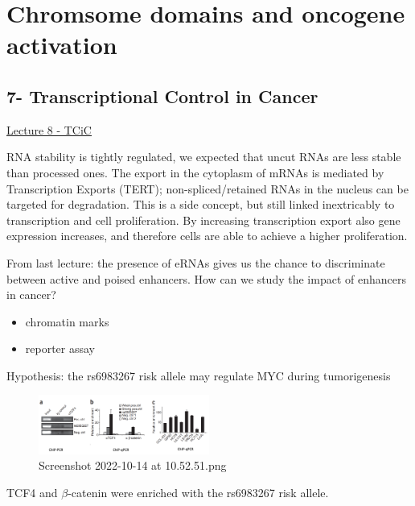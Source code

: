 \graphicspath{{chapters/_resources/}}

\chapter{Chromsome domains and oncogene activation}



\hypertarget{transcriptional-control-in-cancer}{%
\section{7- Transcriptional Control in Cancer}\label{transcriptional-control-in-cancer}}

\href{:/debeaed24e9c444e88c9a5ad1e251391}{Lecture 8 - TCiC}

RNA stability is tightly regulated, we expected that uncut RNAs are less stable than processed ones. The export in the cytoplasm of mRNAs is mediated by Transcription Exports (TERT); non-spliced/retained RNAs in the nucleus can be targeted for degradation. This is a side concept, but still linked inextricably to transcription and cell proliferation. By increasing transcription export also gene expression increases, and therefore cells are able to achieve a higher proliferation.

From last lecture: the presence of eRNAs gives us the chance to discriminate between active and poised enhancers. How can we study the impact of enhancers in cancer?

\begin{itemize}
\tightlist
\item
  chromatin marks
\item
  reporter assay
\end{itemize}

Hypothesis: the rs6983267 risk allele may regulate MYC during tumorigenesis

\begin{figure}
\centering
\includegraphics[width=0.5\textwidth]{../_resources/Screenshot_2022-10-14_at_10-52-51.png}
\caption{Screenshot 2022-10-14 at 10.52.51.png}
\end{figure}

TCF4 and $\beta$-catenin were enriched with the rs6983267 risk allele.


